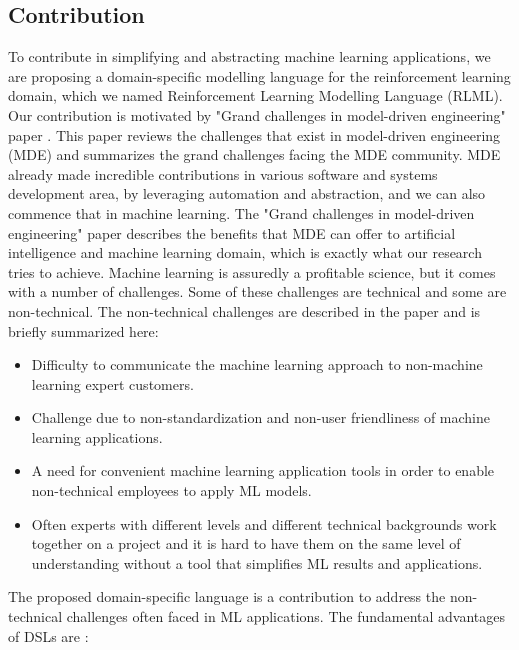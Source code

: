\documentclass[11pt,letterpaper]{ryersonSGSThesis}
\begin{document}
\begin{ryersonSGSThesis}
    \section{Contribution}
        To contribute in simplifying and abstracting machine learning applications, we are proposing a domain-specific modelling language for the reinforcement learning domain, which we named Reinforcement Learning Modelling Language (RLML). Our contribution is motivated by "Grand challenges in model-driven engineering" paper \cite{Bucchiarone2020}. This paper reviews the challenges that exist in model-driven engineering (MDE) and summarizes the grand challenges facing the MDE community. MDE already made incredible contributions in various software and systems development area, by leveraging automation and abstraction, and we can also commence that in machine learning. The "Grand challenges in model-driven engineering" paper \cite{Bucchiarone2020} describes the benefits that MDE can offer to artificial intelligence and machine learning domain, which is exactly what our research tries to achieve. Machine learning is assuredly a profitable science, but it comes with a number of challenges. Some of these challenges are technical and some are non-technical. The non-technical challenges are described in the paper \cite{Baier2019} and is briefly summarized here:
        
        \begin{itemize}
            \item Difficulty to communicate the machine learning approach to non-machine learning expert customers. 
            \item Challenge due to non-standardization and non-user friendliness of machine learning applications.
            \item A need for convenient machine learning application tools in order to enable non-technical employees to apply ML models.
            \item Often experts with different levels and different technical backgrounds work together on a project and it is hard to have them on the same level of understanding without a tool that simplifies ML results and applications.
        \end{itemize}
            
        The proposed domain-specific language is a contribution to address the non-technical challenges often faced in ML applications. The fundamental advantages of DSLs are \cite{books/daglib/0030751}:
        

\end{ryersonSGSThesis}
\end{document}
